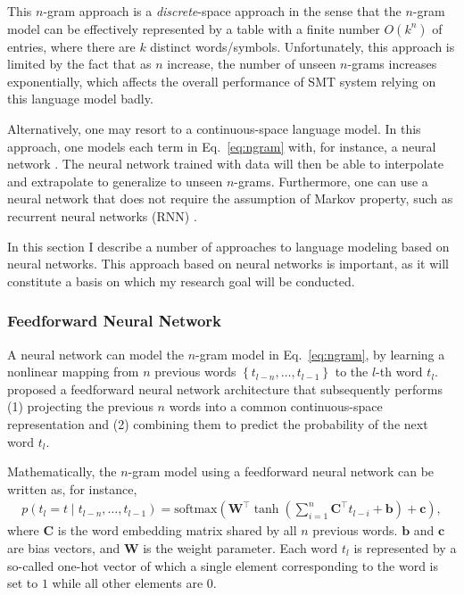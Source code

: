 \documentclass[11pt, oneside]{essay}
\newcommand{\softmax}{\text{softmax}}
\newcommand{\vect}[1]{\mathbf{#1}}
\newcommand{\matr}[1]{\mathbf{#1}}
\newcommand{\vb}[0]{\vect{b}}
\newcommand{\vc}[0]{\vect{c}}
\newcommand{\mW}[0]{\matr{W}}
\newcommand{\mC}{\matr{C}}
\begin{document}
This $n$-gram approach is a \textit{discrete}-space approach in
the sense that the $n$-gram model can be effectively represented
by a table with a finite number $O(k^n)$ of entries, where there
are $k$ distinct words/symbols. Unfortunately, this approach is
limited by the fact that as $n$ increase, the number of unseen
$n$-grams increases exponentially, which affects the overall
performance of SMT system relying on this language model badly. 

Alternatively, one may resort to a continuous-space language
model. In this approach, one models each term in
Eq.~\eqref{eq:ngram} with, for instance, a neural network
\citep{Bengio2003}. The neural network trained with data will
then be able to interpolate and extrapolate to generalize to
unseen $n$-grams. Furthermore, one can use a neural network that
does not require the assumption of Markov property, such as
recurrent neural networks (RNN) \citep{Rumelhart1986,Mikolov2010}. 

In this section I describe a number of approaches to
language modeling based on neural networks. This approach based
on neural networks is important, as it will constitute a basis on
which my research goal will be conducted. 

\subsubsection{Feedforward Neural Network}

A neural network can model the $n$-gram model in
Eq.~\eqref{eq:ngram}, by learning a nonlinear mapping from $n$
previous words $\left\{ t_{l-n}, \dots, t_{l-1} \right\}$ to the
$l$-th word $t_l$. \citet{Bengio2003} proposed a feedforward
neural network architecture that subsequently performs (1)
projecting the previous $n$ words into a common continuous-space
representation and (2) combining them to predict the probability
of the next word $t_l$. 

Mathematically, the $n$-gram model using a feedforward neural
network can be written as, for instance, 
\begin{align}
\label{eq:fflm}
    p(t_l =t \mid t_{l-n}, \dots, t_{l-1}) = \softmax
    \left( \mW^\top \tanh\left(\sum_{i=1}^n \mC^\top t_{l-i} +
    \vb\right) +\vc
    \right),
\end{align}
where $\mC$ is the word embedding matrix shared by all $n$
previous words. $\vb$ and $\vc$ are bias vectors, and $\mW$ is
the weight parameter. Each word $t_l$ is represented by a
so-called one-hot vector of which a single element corresponding
to the word is set to $1$ while all other elements are $0$.
\end{document}
